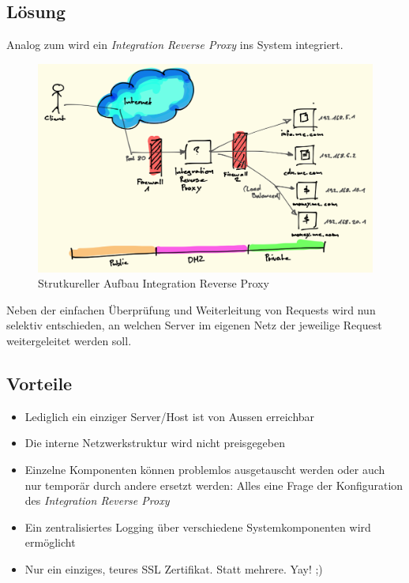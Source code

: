 \newpage
\subsection*{Lösung}
Analog zum  wird ein \emph{Integration Reverse Proxy} ins System integriert.

\begin{figure}[H]
	\centering
	\includegraphics[width=12cm]{content/security/secure-internet-applications/images/integration-reverse-proxy.png}
	\caption{Strutkureller Aufbau Integration Reverse Proxy}
\end{figure}

Neben der einfachen Überprüfung und Weiterleitung von Requests wird nun selektiv entschieden, an welchen Server im eigenen Netz der jeweilige Request weitergeleitet werden soll.


\subsection*{Vorteile}
\begin{itemize}
	\item Lediglich ein einziger Server/Host ist von Aussen erreichbar
	\item Die interne Netzwerkstruktur wird nicht preisgegeben
	\item Einzelne Komponenten können problemlos ausgetauscht werden oder auch nur temporär durch andere ersetzt werden: Alles eine Frage der Konfiguration des \emph{Integration Reverse Proxy}
	\item Ein zentralisiertes Logging über verschiedene Systemkomponenten wird ermöglicht
	\item Nur ein einziges, teures SSL Zertifikat. Statt mehrere. Yay! ;)
\end{itemize}

